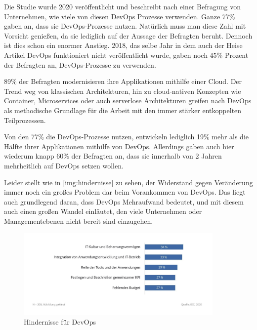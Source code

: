 Die Studie wurde 2020 veröffentlicht und beschreibt nach einer Befragung von Unternehmen, wie viele von diesen DevOps Prozesse verwenden. Ganze 77\% gaben an, dass sie DevOps-Prozesse nutzen. Natürlich muss man diese Zahl mit Vorsicht genießen, da sie lediglich auf der Aussage der Befragten beruht. Dennoch ist dies schon ein enormer Anstieg. 2018, das selbe Jahr in dem auch der Heise Artikel \glqq DevOps funktioniert nicht\grqq \cite{weiss:2018} veröffentlicht wurde, gaben noch 45\% Prozent der Befragten an, DevOps-Prozesse zu verwenden.

89\% der Befragten modernisieren ihre Applikationen mithilfe einer Cloud. Der Trend weg von klassischen Architekturen, hin zu cloud-nativen Konzepten wie Container, Microservices oder auch serverlose Architekturen greifen nach DevOps als methodische Grundlage für die Arbeit mit den immer stärker entkoppelten Teilprozessen.

Von den 77\% die DevOps-Prozesse nutzen, entwickeln lediglich 19\% mehr als die Hälfte ihrer Applikationen mithilfe von DevOps. Allerdings gaben auch hier wiederum knapp 60\% der Befragten an, dass sie innerhalb von 2 Jahren mehrheitlich auf DevOps setzen wollen.

Leider stellt wie in \autoref{img:hindernisse} zu sehen, der Widerstand gegen Veränderung immer noch ein großes Problem dar beim Vorankommen von DevOps. Das liegt auch grundlegend daran, dass DevOps Mehraufwand bedeutet, und mit diesem auch einen großen Wandel einläutet, den viele Unternehmen oder Managementebenen nicht bereit sind einzugehen.

\begin{figure}[h]
\centering
\includegraphics[width=0.9\textwidth]{Graphics/idc_hindernisse}
\caption{Hindernisse für DevOps \cite{idc:2020}}
\label{img:hindernisse}
\end{figure}

